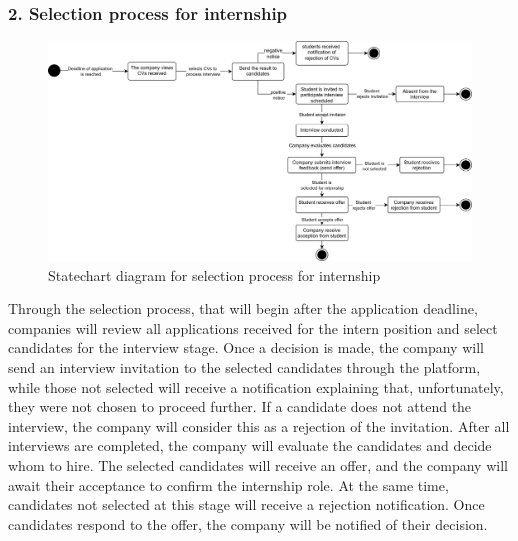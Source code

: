\subsubsection{2. Selection process for internship}\label{subsubsec:internship_feedback}
\begin{figure}[H]
    \centering
    \includegraphics[width=1\textwidth]{Images/Statecharts/Selection_process.png}
    \caption{Statechart diagram for selection process for internship}\label{fig:statechart_selection_process_for_internship}
\end{figure}
Through the selection process, that will begin after the application deadline, companies will review all applications received for the intern position 
and select candidates for the interview stage. Once a decision is made, the company will send an interview invitation to the selected candidates through 
the platform, while those not selected will receive a notification explaining that, unfortunately, they were not chosen to proceed further.
If a candidate does not attend the interview, the company will consider this as a rejection of the invitation.
After all interviews are completed, the company will evaluate the candidates and decide whom to hire. The selected candidates will receive an offer, 
and the company will await their acceptance to confirm the internship role. At the same time, candidates not selected at this stage will receive a 
rejection notification. Once candidates respond to the offer, the company will be notified of their decision.

